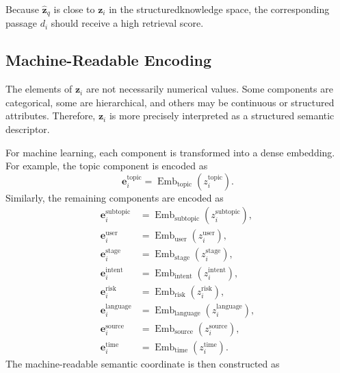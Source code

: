 \documentclass{article}
\begin{document}
Because $\hat{\mathbf{z}}_q$ is close to $\mathbf{z}_i$ in the structuredknowledge space, the corresponding passage $d_i$ should receive a high retrieval score.

\subsection{Machine-Readable Encoding}
The elements of $\mathbf{z}_i$ are not necessarily numerical values. Some components are categorical, some are hierarchical, and others may be continuous or structured attributes. Therefore, $\mathbf{z}_i$ is more precisely interpreted as a structured semantic descriptor.

For machine learning, each component is transformed into a dense embedding. For example, the topic component is encoded as
\begin{equation}
    \mathbf{e}_i^{\mathrm{topic}}
    =
    \operatorname{Emb}_{\mathrm{topic}}
    \left(
    z_i^{\mathrm{topic}}
    \right).
\end{equation}
Similarly, the remaining components are encoded as
\begin{align}
    \mathbf{e}_i^{\mathrm{subtopic}}
    &=
    \operatorname{Emb}_{\mathrm{subtopic}}
    \left(
    z_i^{\mathrm{subtopic}}
    \right),\\
    \mathbf{e}_i^{\mathrm{user}}
    &=
    \operatorname{Emb}_{\mathrm{user}}
    \left(
    z_i^{\mathrm{user}}
    \right),\\
    \mathbf{e}_i^{\mathrm{stage}}
    &=
    \operatorname{Emb}_{\mathrm{stage}}
    \left(
    z_i^{\mathrm{stage}}
    \right),\\
    \mathbf{e}_i^{\mathrm{intent}}
    &=
    \operatorname{Emb}_{\mathrm{intent}}
    \left(
    z_i^{\mathrm{intent}}
    \right),\\
    \mathbf{e}_i^{\mathrm{risk}}
    &=
    \operatorname{Emb}_{\mathrm{risk}}
    \left(
    z_i^{\mathrm{risk}}
    \right),\\
    \mathbf{e}_i^{\mathrm{language}}
    &=
    \operatorname{Emb}_{\mathrm{language}}
    \left(
    z_i^{\mathrm{language}}
    \right),\\
    \mathbf{e}_i^{\mathrm{source}}
    &=
    \operatorname{Emb}_{\mathrm{source}}
    \left(
    z_i^{\mathrm{source}}
    \right),\\
    \mathbf{e}_i^{\mathrm{time}}
    &=
    \operatorname{Emb}_{\mathrm{time}}
    \left(
    z_i^{\mathrm{time}}
    \right).
\end{align}
The machine-readable semantic coordinate is then constructed as
\end{document}
